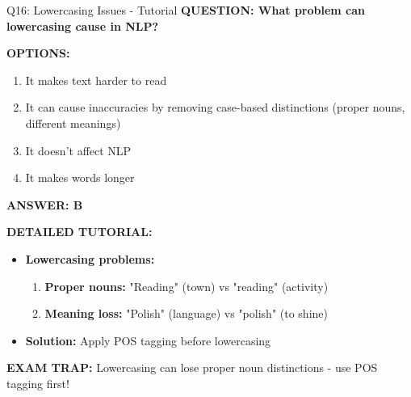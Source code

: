 \documentclass[8pt]{beamer}
\begin{document}
	\begin{frame}{Q16: Lowercasing Issues - Tutorial}
		\fontsize{6.5}{7.5}\selectfont
		\textbf{QUESTION: What problem can lowercasing cause in NLP?}
		
		\vspace{0.1cm}
		\textbf{OPTIONS:}
		\begin{enumerate}
			\item It makes text harder to read
			\item It can cause inaccuracies by removing case-based distinctions (proper nouns, different meanings)
			\item It doesn't affect NLP
			\item It makes words longer
		\end{enumerate}
		
		\vspace{0.1cm}
		\textcolor{myblue}{\textbf{ANSWER: B}}
		
		\vspace{0.1cm}
		\textbf{DETAILED TUTORIAL:}
		\begin{itemize}
			\item \textbf{Lowercasing problems:}
			\begin{enumerate}
				\item \textbf{Proper nouns:} "Reading" (town) vs "reading" (activity)
				\item \textbf{Meaning loss:} "Polish" (language) vs "polish" (to shine)
			\end{enumerate}
			\item \textbf{Solution:} Apply POS tagging before lowercasing
		\end{itemize}
		
		\textcolor{myred}{\textbf{EXAM TRAP:}} Lowercasing can lose \textcolor{myblue}{proper noun distinctions} - use POS tagging first!
	\end{frame}
	
\end{document}
